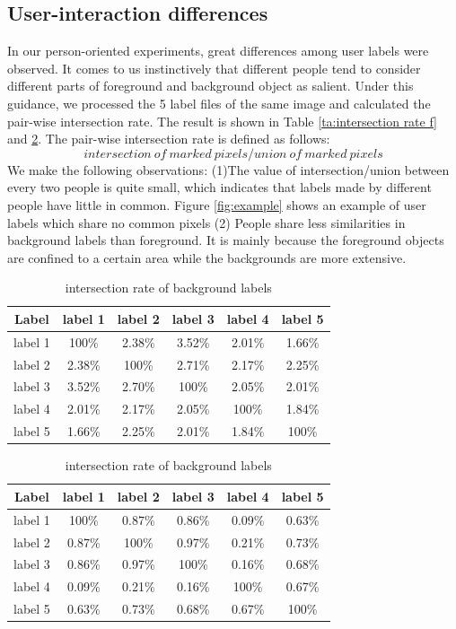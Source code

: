 \documentclass[runningheads,a4paper]{llncs}
\begin{document}
\subsection{User-interaction differences}
In our person-oriented experiments, great differences among user labels were observed. It comes to us instinctively that different people tend to consider different parts of foreground and background object as salient. Under this guidance, we processed the 5 label files of the same image and calculated the pair-wise intersection rate. The result is shown in Table \ref{ta:intersection rate f} and \ref{ta:intersection rate b}. The pair-wise intersection rate is defined as follows:
$$intersection\ of\ marked\ pixels/union\ of\ marked\ pixels$$
We make the following observations: (1)The value of intersection/union between every two people is quite small, which indicates that labels made by different people have little in common. Figure \ref{fig:example} shows an example of user labels which share no common pixels (2) People share less similarities in background labels than foreground. It is mainly because the foreground objects are confined to a certain area while the backgrounds are more extensive.




\begin{table}
\parbox{.35\linewidth}{
\centering
\begin{tabular}{|c|c|c|c|c|c|}
\hline
 Label & label 1 & label 2 & label 3 & label 4& label 5 \\
\hline
label 1 & 100\% & 2.38\% & 3.52\% & 2.01\%& 1.66\% \\
\hline
label 2 & 2.38\% & 100\% & 2.71\% & 2.17\%& 2.25\% \\
\hline
label 3 & 3.52\% & 2.70\% & 100\% & 2.05\%& 2.01\%\\
\hline
label 4 & 2.01\% & 2.17\% & 2.05\% & 100\%& 1.84\% \\
\hline
label 5 & 1.66\% & 2.25\% & 2.01\% & 1.84\%& 100\% \\
\hline
\end{tabular}
\caption{intersection rate of foreground labels}
\label{ta:intersection rate f}
}
\hfill
\parbox{.35\linewidth}{
\centering
\begin{tabular}{|c|c|c|c|c|c|}
\hline
 Label & label 1 & label 2 & label 3 & label 4& label 5 \\
\hline
label 1 & 100\% & 0.87\% & 0.86\% & 0.09\%& 0.63\% \\
\hline
label 2 & 0.87\% & 100\% & 0.97\% & 0.21\%& 0.73\% \\
\hline
label 3 & 0.86\% & 0.97\% & 100\% & 0.16\%& 0.68\%\\
\hline
label 4 & 0.09\% & 0.21\% & 0.16\% & 100\%& 0.67\% \\
\hline
label 5 & 0.63\% & 0.73\% & 0.68\% & 0.67\% & 100\% \\
\hline
\end{tabular}
\captionsetup{justification=centerlast}
\caption{intersection rate of background labels}
\label{ta:intersection rate b}
}
\end{table}
\end{document}
